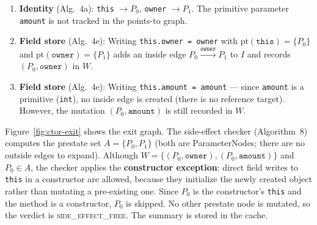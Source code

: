\begin{enumerate}
\item \textbf{Identity} (Alg.~4a): \texttt{this} $\to P_0$, \texttt{owner} $\to P_1$. The primitive parameter \texttt{amount} is not tracked in the points-to graph.

\item \textbf{Field store} (Alg.~4e): Writing \texttt{this.owner = owner} with $\text{pt}(\texttt{this}) = \{P_0\}$ and $\text{pt}(\texttt{owner}) = \{P_1\}$ adds an inside edge $P_0 \xrightarrow{\texttt{owner}} P_1$ to $I$ and records $(P_0, \texttt{owner})$ in $W$.

\item \textbf{Field store} (Alg.~4e): Writing \texttt{this.amount = amount} --- since \texttt{amount} is a primitive (\texttt{int}), no inside edge is created (there is no reference target). However, the mutation $(P_0, \texttt{amount})$ is still recorded in $W$.
\end{enumerate}

\noindent
Figure~\ref{fig:ctor-exit} shows the exit graph. The side-effect checker (Algorithm~8) computes the prestate set $A = \{P_0, P_1\}$ (both are ParameterNodes; there are no outside edges to expand). Although $W = \{(P_0, \texttt{owner}), (P_0, \texttt{amount})\}$ and $P_0 \in A$, the checker applies the \textbf{constructor exception}: direct field writes to \texttt{this} in a constructor are allowed, because they initialize the newly created object rather than mutating a pre-existing one. Since $P_0$ is the constructor's \texttt{this} and the method is a constructor, $P_0$ is skipped. No other prestate node is mutated, so the verdict is \textsc{side\_effect\_free}. The summary is stored in the cache.

